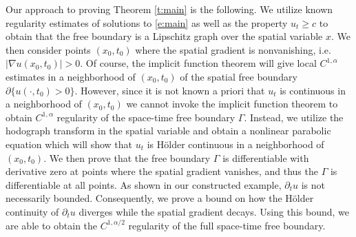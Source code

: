 \documentclass{amsart}
\numberwithin{equation}{section}
\begin{document}
   Our approach to proving Theorem \ref{t:main} is the following. We utilize known regularity estimates of solutions to \eqref{e:main} as well as the property $u_t \geq c$ to obtain that the free boundary is a Lipschitz graph over the spatial variable $x$. We then consider points $(x_0,t_0)$ where the spatial gradient is nonvanishing, i.e. $|\nabla u(x_0,t_0)|>0$. Of course, the implicit function theorem will give local $C^{1,\alpha}$ estimates in a neighborhood of $(x_0,t_0)$ of the spatial free boundary $\partial\{u(\cdot, t_0)>0\}$. However, since it is not known a priori that $u_t$ is continuous in a neighborhood of $(x_0,t_0)$ we cannot invoke the implicit function theorem to obtain $C^{1,\alpha}$ regularity of the space-time free boundary $\Gamma$. Instead, we utilize the hodograph transform in the spatial variable and obtain a nonlinear parabolic equation which will show that $u_t$ is H\"older continuous in a neighborhood of $(x_0,t_0)$. We then prove that the free boundary $\Gamma$ is differentiable with derivative zero at points where the spatial gradient vanishes, and thus the $\Gamma$ is differentiable at all points. As shown in our constructed example, $\partial_t u$ is not necessarily bounded. Consequently, we prove a bound on how the H\"older continuity of $\partial_t u$ diverges while the spatial gradient decays. Using this bound, we are able to obtain the $C^{1,\alpha/2}$ regularity of the full space-time free boundary. 

\end{document}
